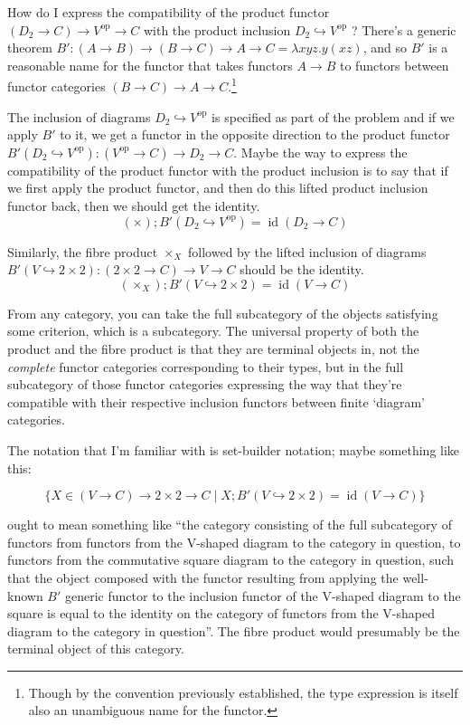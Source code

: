 \documentclass[11pt,noamsfonts]{amsart}
\DeclareMathOperator{\op}{op}
\DeclareMathOperator{\id}{id}
\begin{document}
How do I express the compatibility of the product functor \( (D_2 \to C) \to V^{\op} \to C \) with the product inclusion \( D_2 \hookrightarrow V^{\op} \) ?
There's a generic theorem \( B': (A \to B) \to (B \to C) \to A \to C = \lambda x y z . y (x z) \), and so \(B'\) is a reasonable name for the functor that takes functors \( A \to B \) to functors between functor categories \( (B \to C) \to A \to C \).\footnote{Though by the convention previously established, the type expression is itself also an unambiguous name for the functor.}

The inclusion of diagrams \( D_2 \hookrightarrow V^{\op} \) is specified as part of the problem and if we apply \( B' \) to it, we get a functor in the opposite direction to the product functor \( B' (D_2 \hookrightarrow V^{\op}) : (V^{\op} \to C) \to D_2 \to C \). Maybe the way to express the compatibility of the product functor with the product inclusion is to say that if we first apply the product functor, and then do this lifted product inclusion functor back, then we should get the identity. 
\[
(\times) ; B' (D_2 \hookrightarrow V^{\op}) = \id (D_2 \to C)
\]

Similarly, the fibre product \( \times_{X} \) followed by the lifted inclusion of diagrams \( B' (V \hookrightarrow 2 \times 2) : (2 \times 2 \to C) \to V \to C \) should be the identity.
\[
(\times_X) ; B' (V \hookrightarrow 2 \times 2) = \id (V \to C)
\]

From any category, you can take the full subcategory of the objects satisfying some criterion, which is a subcategory. The universal property of both the product and the fibre product is that they are terminal objects in, not the \emph{complete} functor categories corresponding to their types, but in the full subcategory of those functor categories expressing the way that they're compatible with their respective inclusion functors between finite `diagram' categories.

The notation that I'm familiar with is set-builder notation; maybe something like this:

\[
\{ X \in (V \to C) \to 2 \times 2 \to C \mid  
X ; B' (V \hookrightarrow 2 \times 2) = \id (V \to C)
\}
\]

ought to mean something like ``the category consisting of the full subcategory of functors from functors from the V-shaped diagram to the category in question, to functors from the commutative square diagram to the category in question, such that the object composed with the functor resulting from applying the well-known \( B' \) generic functor to the inclusion functor of the V-shaped diagram to the square is equal to the identity on the category of functors from the V-shaped diagram to the category in question''. The fibre product would presumably be the terminal object of this category.
\end{document}
